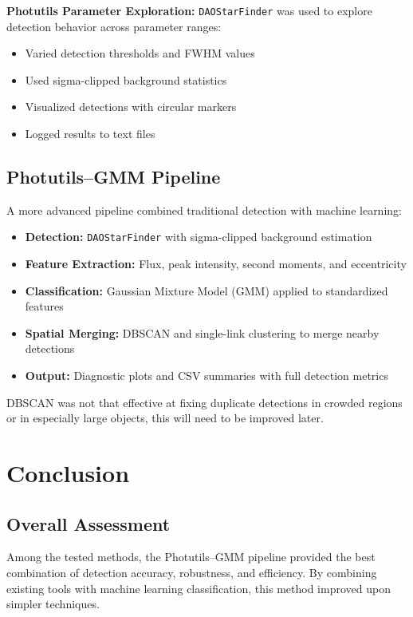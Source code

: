 \documentclass[12pt]{article}
\begin{document}
\textbf{Photutils Parameter Exploration:}
\texttt{DAOStarFinder} was used to explore detection behavior across parameter ranges:
\begin{itemize}
    \item Varied detection thresholds and FWHM values
    \item Used sigma-clipped background statistics
    \item Visualized detections with circular markers
    \item Logged results to text files
\end{itemize}

\subsection{Photutils--GMM Pipeline}
A more advanced pipeline combined traditional detection with machine learning:
\begin{itemize}
    \item \textbf{Detection:} \texttt{DAOStarFinder} with sigma-clipped background estimation
    \item \textbf{Feature Extraction:} Flux, peak intensity, second moments, and eccentricity
    \item \textbf{Classification:} Gaussian Mixture Model (GMM) applied to standardized features
    \item \textbf{Spatial Merging:} DBSCAN and single-link clustering to merge nearby detections
    \item \textbf{Output:} Diagnostic plots and CSV summaries with full detection metrics
\end{itemize}

DBSCAN was not that effective at fixing duplicate detections in crowded regions or in especially large objects, this will need to be improved later.

\section{Conclusion}

\subsection{Overall Assessment}
Among the tested methods, the Photutils--GMM pipeline provided the best combination of detection accuracy, robustness, and efficiency. By combining existing tools with machine learning classification, this method improved upon simpler techniques.
\end{document}
